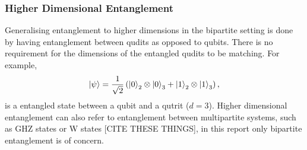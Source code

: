 \subsubsection{Higher Dimensional Entanglement}
Generalising entanglement to higher dimensions in the bipartite setting is done by having entanglement between qudits as opposed to qubits.
There is no requirement for the dimensions of the entangled qudits to be matching.
For example,
\begin{equation}
    \ket{\psi} = \frac{1}{\sqrt{2}}\left(\ket{0}_2\otimes\ket{0}_3 + \ket{1}_2\otimes\ket{1}_3\right),
\end{equation}
is a entangled state between a qubit and a qutrit ($d=3$).
Higher dimensional entanglement can also refer to entanglement between multipartite systems, such as GHZ states or W states [CITE THESE THINGS], in this report only bipartite entanglement is of concern.

